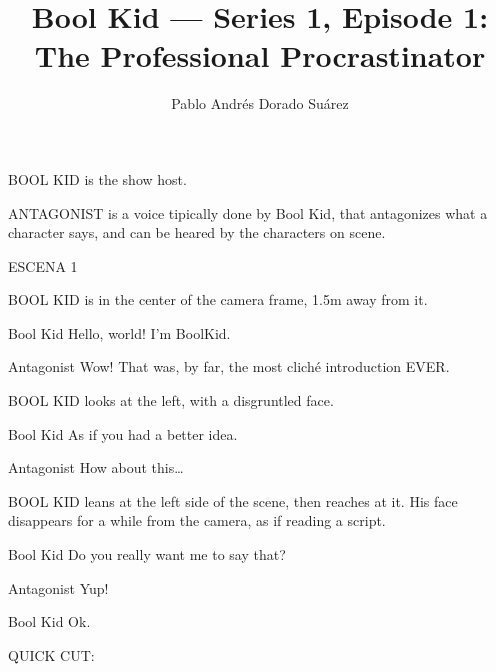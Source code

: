 \documentclass{screenplay}[2018/01/07]
\title{Bool Kid — Series 1, Episode 1: The Professional Procrastinator}
\author{Pablo Andrés Dorado Suárez}
\begin{document}
    \coverpage

    \fadein
    BOOL KID is the show host.

    ANTAGONIST is a voice tipically done by Bool Kid, that antagonizes what a
    character says, and can be heared by the characters on scene.

    \vspace{1em}
    \begin{center}
        ESCENA 1
    \end{center}
    \vspace{2em}


    BOOL KID is in the center of the camera frame, 1.5m away from it.

    \begin{dialogue}{Bool Kid}
        Hello, world! I'm BoolKid.
    \end{dialogue}

    \begin{dialogue}{Antagonist}
        Wow! That was, by far, the most cliché introduction EVER.
    \end{dialogue}

    BOOL KID looks at the left, with a disgruntled face.

    \begin{dialogue}{Bool Kid}
        As if you had a better idea.
    \end{dialogue}

    \begin{dialogue}{Antagonist}
        How about this\dots
    \end{dialogue}

    BOOL KID leans at the left side of the scene, then reaches at it. His face
    disappears for a while from the camera, as if reading a script.

    \begin{dialogue}{Bool Kid}
        Do you really want me to say that?
    \end{dialogue}

    \begin{dialogue}{Antagonist}
        Yup!
    \end{dialogue}

    \begin{dialogue}[sighing]{Bool Kid}
        Ok.
    \end{dialogue}

    \begin{flushright}
        QUICK CUT:
    \end{flushright}
\end{document}
